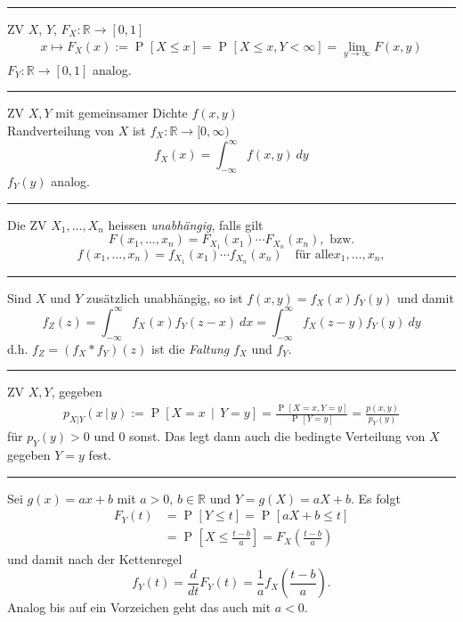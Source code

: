 \documentclass[a4paper, 12pt]{extarticle}
\newcommand{\sep}{\vspace{5pt}\noindent\hrule\vspace{5pt}}
\newcommand{\R}{\mathbb{R}}
\newcommand{\Prob}[2][]{\operatorname{P}_{#1}\left[ #2 \right]}
\newcommand{\cProb}[2]{\operatorname{P}\left[ #1 \,\middle|\, #2 \right]}
\begin{document}
\begin{multicols*}{2}
\sep


ZV $X$, $Y$, $F_X\colon\R\to[0,1]$
\begin{gather*}
x\mapsto F_X(x):=\Prob{X\leq x}=\Prob{X\leq x, Y<\infty}=\lim_{y\to\infty}
F(x,y)
\end{gather*}
\Com $F_Y\colon\R\to[0,1]$ analog.

\sep


ZV $X,Y$ mit gemeinsamer Dichte $f(x,y)$\\
Randverteilung von $X$ ist $f_X\colon\R\to[0,\infty)$
\[
f_X(x)=\int_{-\infty}^\infty f(x,y) \ dy	
\]
\Com $f_Y(y)$ analog.

\sep

\Def[Unabhängigkeit] Die ZV $X_1,\ldots,X_n$ heissen
\emph{unabhängig}, falls gilt
\[
F(x_1,\ldots,x_n)=F_{X_1}(x_1)\cdots F_{X_n}(x_n), \text{ bzw.}
\]
\[
f(x_1,\ldots,x_n) = f_{X_1}(x_1)\cdots f_{X_n}(x_n)\quad \text{für alle
}x_1,\ldots,x_n,
\]

\sep


Sind $X$ und $Y$ zusätzlich unabhängig, so ist $f(x,y)=f_X(x)f_Y(y)$ und damit
\[
f_Z(z)=\int_{-\infty}^{\infty} f_X(x)f_Y(z-x) \ dx
=\int_{-\infty}^{\infty} f_X(z-y)f_Y(y) \ dy
\]
d.h. $f_Z=(f_X * f_Y)(z)$ ist die \emph{Faltung} $f_X$
und $f_Y$.

\sep


ZV $X,Y$, gegeben
\begin{gather*}
p_{X|Y}(x\,|\,y):=\cProb{X=x}{Y=y}
=\frac{\Prob{X=x,Y=y}}{\Prob{Y=y}}
=\frac{p(x,y)}{p_Y(y)}
\end{gather*}
für $p_Y(y)>0$ und $0$ sonst. Das legt dann auch die bedingte Verteilung von $X$
gegeben $Y=y$ fest.

\sep


Sei $g(x)=ax+b$ mit $a>0$, $b\in\R$ und $Y=g(X) = aX+b$. Es folgt
\begin{align*}
F_Y(t)&=\Prob{Y\leq t} = \Prob{aX+b\leq t}
\\ 
&= \Prob{X\leq \frac{t-b}{a}}=F_X\left(\frac{t-b}{a}\right)
\end{align*}
und damit nach der Kettenregel
\[
f_Y(t) = \frac{d}{dt}F_Y(t) = \frac{1}{a} f_X\left(\frac{t-b}{a}\right).
\]
Analog bis auf ein Vorzeichen geht das auch mit $a<0$.


\end{multicols*}
\end{document}
